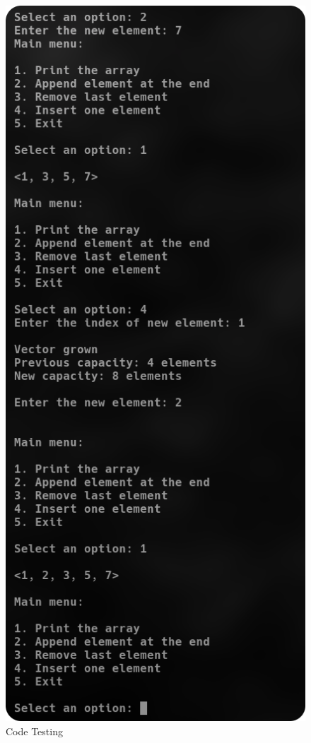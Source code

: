 \documentclass[
	letterpaper, %
	10pt, %
]{CSUniSchoolLabReport}
\begin{document}
\begin{figure}[H]
  \centering
  \includegraphics[height=.9\textheight]{Figures/6_4-4.png}
  \caption{Code Testing}
  \label{fig:9}
\end{figure}
\end{document}
